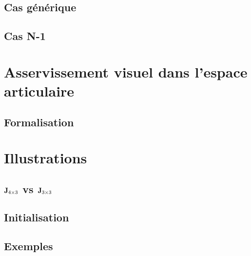 \subsection{Cas g\'en\'erique}

\subsection{Cas N-1}


\section{Asservissement visuel dans l'espace articulaire}

\subsection{Formalisation}

\section{Illustrations}

\subsection{${\bf J}_{4 \times 3}$ vs ${\bf J}_{3 \times 3}$}

\subsection{Initialisation}

\subsection{Exemples}


















